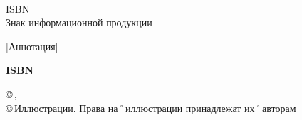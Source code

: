 \begin{titlepage}
	\vfill
	\noindent
	\hspace{1em}\hphantom{\AuthorMark}
	{\bfseries\AuthorAbbrB}
	
	\noindent
	\AuthorMark\hspace{1em}
	\begin{minipage}[t]{\linewidth-1em-\widthof{\AuthorMark}}
		{\hspace{1.5em}\BibInfo\\[1ex]}
		{\hspace{1.5em}ISBN \ISBN\\}
		{\hspace{1.5em}Знак информационной продукции \large\textbf{\AgeLimit}}
	\end{minipage}
	
	\vfill
	\noindent
	\hspace{1em}\hphantom{\AuthorMark}
	\begin{minipage}[t]{\linewidth-1em-\widthof{\AuthorMark}}
		\small	[Аннотация] 		
	\end{minipage}
		
	\noindent	
	\begin{flushright}
		\bibInd{\UDK}{\BBK}{}	
	\end{flushright}
	
	\vfill
	\noindent
	\parbox[b]{.4\linewidth}{\small\bfseries ISBN \ISBN}
	\hfill
	\parbox[b]{.5\linewidth}
	{\raggedright\small
	 ©\,\AuthorAbbrA, \YearPub\\
	 ©\,Иллюстрации. Права на˚иллюстрации принадлежат их˚авторам	
	}
	
\end{titlepage}